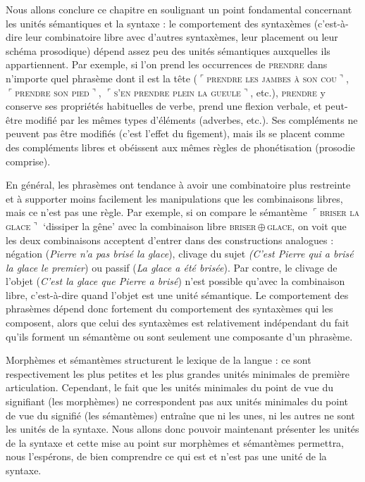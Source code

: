Nous allons conclure ce chapitre en soulignant un point fondamental concernant les unités sémantiques et la syntaxe : le comportement des syntaxèmes (c’est-à-dire leur combinatoire libre avec d’autres syntaxèmes, leur placement ou leur schéma prosodique) dépend assez peu des unités sémantiques auxquelles ils appartiennent. Par exemple, si l’on prend les occurrences de \textsc{prendre} dans n’importe quel phrasème dont il est la tête ($⌜$\textsc{prendre} \textsc{les} \textsc{jambes} \textsc{à} \textsc{son} \textsc{cou}$⌝$, $⌜$\textsc{prendre} \textsc{son} \textsc{pied}$⌝$, $⌜$\textsc{s’en} \textsc{prendre} \textsc{plein} \textsc{la} \textsc{gueule}$⌝$, etc.), \textsc{prendre} y conserve ses propriétés habituelles de verbe, prend une flexion verbale, et peut-être modifié par les mêmes types d’éléments (adverbes, etc.). Ses compléments ne peuvent pas être modifiés (c’est l’effet du figement), mais ils se placent comme des compléments libres et obéissent aux mêmes règles de phonétisation (prosodie comprise).

En général, les phrasèmes ont tendance à avoir une combinatoire plus restreinte et à supporter moins facilement les manipulations que les combinaisons libres, mais ce n’est pas une règle. Par exemple, si on compare le sémantème $⌜$\textsc{briser} \textsc{la} \textsc{glace}$⌝$ ‘dissiper la gêne’ avec la combinaison libre \textsc{briser}\,${\oplus}$\,\textsc{glace}, on voit que les deux combinaisons acceptent d’entrer dans des constructions analogues : négation (\textit{Pierre n’a pas brisé la glace}), clivage du sujet \textit{(C’est Pierre qui a brisé la glace le premier}) ou passif (\textit{La glace a été brisée}). Par contre, le clivage de l’objet (\textit{C’est la glace que Pierre a brisé}) n’est possible qu’avec la combinaison libre, c’est-à-dire quand l’objet est une unité sémantique. Le comportement des phrasèmes dépend donc fortement du comportement des syntaxèmes qui les composent, alors que celui des syntaxèmes est relativement indépendant du fait qu’ils forment un sémantème ou sont seulement une composante d’un phrasème.

Morphèmes et sémantèmes structurent le lexique de la langue : ce sont respectivement les plus petites et les plus grandes unités minimales de première articulation. Cependant, le fait que les unités minimales du point de vue du signifiant (les morphèmes) ne correspondent pas aux unités minimales du point de vue du signifié (les sémantèmes) entraîne que ni les unes, ni les autres ne sont les unités de la syntaxe. Nous allons donc pouvoir maintenant présenter les unités de la syntaxe et cette mise au point sur morphèmes et sémantèmes permettra, nous l’espérons, de bien comprendre ce qui est et n’est pas une unité de la syntaxe.

